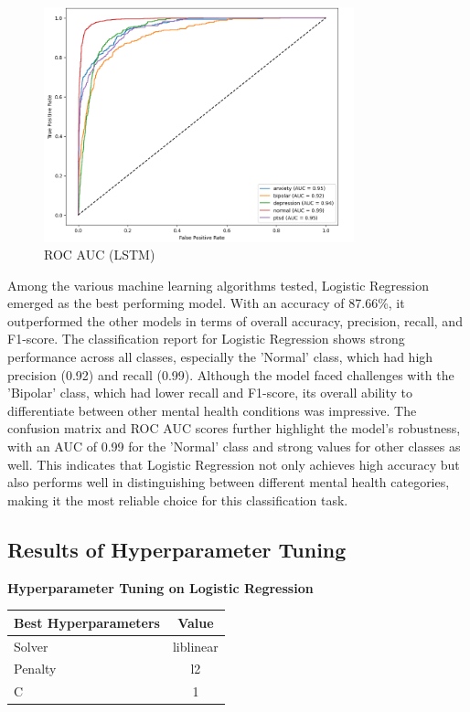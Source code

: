 \begin{figure}[h!]  
    \centering
    \includegraphics[width=0.8\textwidth]{Images/LSTM ROC.png}  
    \caption{ROC AUC (LSTM)}
    \label{LSTMROC}  %
\end{figure}

\pagebreak
\noindent
Among the various machine learning algorithms tested, Logistic Regression emerged as the best performing model. With an accuracy of 87.66\%, it outperformed the other models in terms of overall accuracy, precision, recall, and F1-score. The classification report for Logistic Regression shows strong performance across all classes, especially the 'Normal' class, which had high precision (0.92) and recall (0.99). Although the model faced challenges with the 'Bipolar' class, which had lower recall and F1-score, its overall ability to differentiate between other mental health conditions was impressive. The confusion matrix and ROC AUC scores further highlight the model’s robustness, with an AUC of 0.99 for the 'Normal' class and strong values for other classes as well. This indicates that Logistic Regression not only achieves high accuracy but also performs well in distinguishing between different mental health categories, making it the most reliable choice for this classification task.


\subsection{Results of Hyperparameter Tuning}

\begin{center}
    \textbf{Hyperparameter Tuning on Logistic Regression} \\[0.5em]
    \begin{tabular}{|l|c|}
        \hline
        \textbf{Best Hyperparameters}  & \textbf{Value} \\ \hline
        Solver                        & liblinear      \\ \hline
        Penalty                       & l2             \\ \hline
        C                              & 1              \\ \hline
    \end{tabular}
\end{center}

